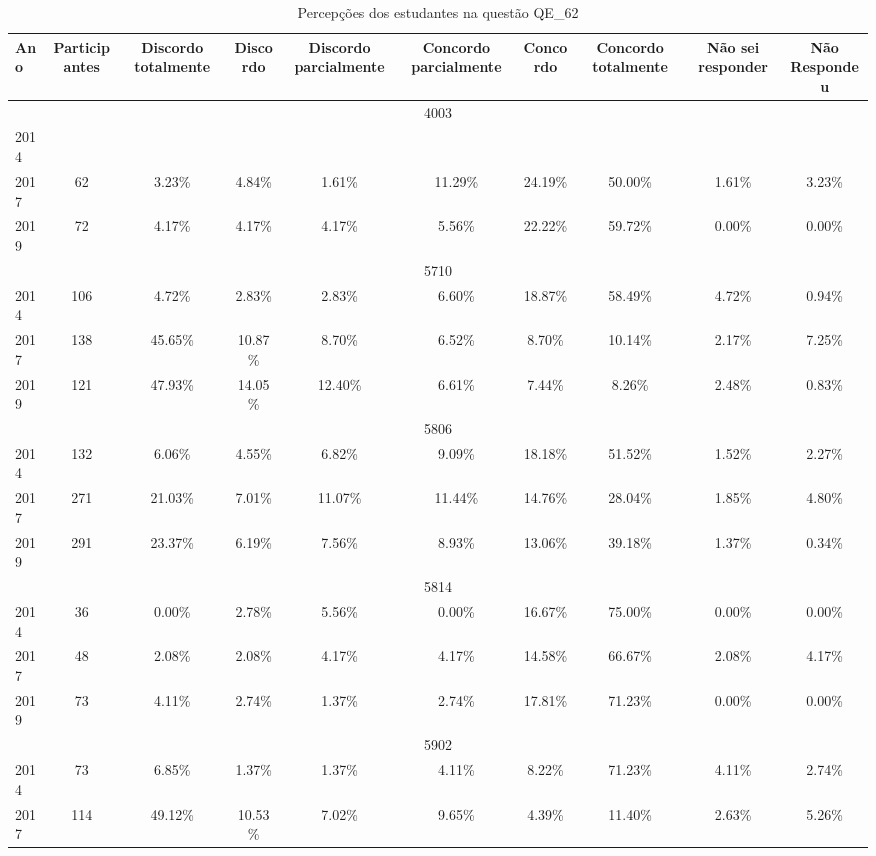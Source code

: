 \begin{table}[H]
\centering
\caption{Percepções dos estudantes na questão QE\_62}
\begin{tabular}{|l|c|ccc|ccc|cc|}
\hline
\toprule
Ano & Participantes & Discordo totalmente & Discordo & Discordo parcialmente & Concordo parcialmente & Concordo & Concordo totalmente & Não sei responder & Não Respondeu \\
\midrule
\hline
\multicolumn{10}{|c|}{4003}\\
\hline
2014 & & & & & & & & & \\
2017 & 62 & 3.23\% & 4.84\% & 1.61\% & 11.29\% & 24.19\% & 50.00\% & 1.61\% & 3.23\%\\
2019 & 72 & 4.17\% & 4.17\% & 4.17\% & 5.56\% & 22.22\% & 59.72\% & 0.00\% & 0.00\%\\
\hline
\hline
\multicolumn{10}{|c|}{5710}\\
\hline
2014 & 106 & 4.72\% & 2.83\% & 2.83\% & 6.60\% & 18.87\% & 58.49\% & 4.72\% & 0.94\%\\
2017 & 138 & 45.65\% & 10.87\% & 8.70\% & 6.52\% & 8.70\% & 10.14\% & 2.17\% & 7.25\%\\
2019 & 121 & 47.93\% & 14.05\% & 12.40\% & 6.61\% & 7.44\% & 8.26\% & 2.48\% & 0.83\%\\
\hline
\hline
\multicolumn{10}{|c|}{5806}\\
\hline
2014 & 132 & 6.06\% & 4.55\% & 6.82\% & 9.09\% & 18.18\% & 51.52\% & 1.52\% & 2.27\%\\
2017 & 271 & 21.03\% & 7.01\% & 11.07\% & 11.44\% & 14.76\% & 28.04\% & 1.85\% & 4.80\%\\
2019 & 291 & 23.37\% & 6.19\% & 7.56\% & 8.93\% & 13.06\% & 39.18\% & 1.37\% & 0.34\%\\
\hline
\hline
\multicolumn{10}{|c|}{5814}\\
\hline
2014 & 36 & 0.00\% & 2.78\% & 5.56\% & 0.00\% & 16.67\% & 75.00\% & 0.00\% & 0.00\%\\
2017 & 48 & 2.08\% & 2.08\% & 4.17\% & 4.17\% & 14.58\% & 66.67\% & 2.08\% & 4.17\%\\
2019 & 73 & 4.11\% & 2.74\% & 1.37\% & 2.74\% & 17.81\% & 71.23\% & 0.00\% & 0.00\%\\
\hline
\hline
\multicolumn{10}{|c|}{5902}\\
\hline
2014 & 73 & 6.85\% & 1.37\% & 1.37\% & 4.11\% & 8.22\% & 71.23\% & 4.11\% & 2.74\%\\
2017 & 114 & 49.12\% & 10.53\% & 7.02\% & 9.65\% & 4.39\% & 11.40\% & 2.63\% & 5.26\%\\

\end{tabular}
\end{table}

